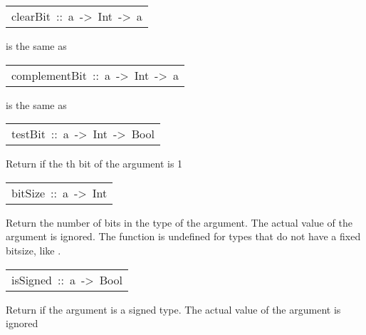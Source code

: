 \begin{haddockdesc}
\begin{haddockdesc}
\end{haddockdesc}
\begin{haddockdesc}
\item[\begin{tabular}{@{}l}
clearBit\ ::\ a\ ->\ Int\ ->\ a
\end{tabular}]\haddockbegindoc
{} is the same as 
\par

\end{haddockdesc}
\begin{haddockdesc}
\item[\begin{tabular}{@{}l}
complementBit\ ::\ a\ ->\ Int\ ->\ a
\end{tabular}]\haddockbegindoc
{} is the same as 
\par

\end{haddockdesc}
\begin{haddockdesc}
\item[\begin{tabular}{@{}l}
testBit\ ::\ a\ ->\ Int\ ->\ Bool
\end{tabular}]\haddockbegindoc
Return  if the th bit of the argument is 1
\par

\end{haddockdesc}
\begin{haddockdesc}
\item[\begin{tabular}{@{}l}
bitSize\ ::\ a\ ->\ Int
\end{tabular}]\haddockbegindoc
Return the number of bits in the type of the argument.  The actual
        value of the argument is ignored.  The function  is
        undefined for types that do not have a fixed bitsize, like .
\par

\end{haddockdesc}
\begin{haddockdesc}
\item[\begin{tabular}{@{}l}
isSigned\ ::\ a\ ->\ Bool
\end{tabular}]\haddockbegindoc
Return  if the argument is a signed type.  The actual
        value of the argument is ignored 
\par


\end{haddockdesc}
\end{haddockdesc}
